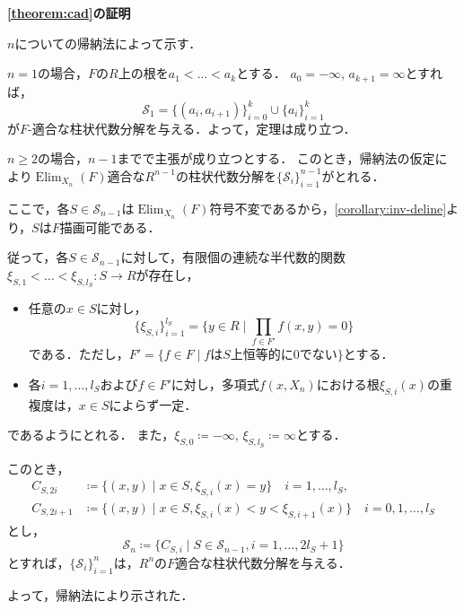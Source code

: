 \documentclass[uplatex, dvipdfmx]{jsarticle}
\makeatletter
\numberwithin{equation}{section}
\renewenvironment{proof}[1][\proofname]{\par
  \pushQED{\qed}%
  \normalfont \topsep6\p@\@plus6\p@\relax
  \trivlist
  \item\relax
  {\bfseries
  #1\@addpunct{.}}\hspace\labelsep\ignorespaces
}{
  \popQED\endtrivlist\@endpefalse
}
\newcommand{\map}[3]{{#1}\colon{#2}\rightarrow{#3}}
\DeclareMathOperator{\Elim}{Elim}
\theoremstyle{definition}
\renewcommand{\proofname}{\textbf{証明}}
\makeatother
\begin{document}
\begin{proof}[\cref{theorem:cad}の証明]
     $n$についての帰納法によって示す．

     $n=1$の場合，$F$の$R$上の根を$a_1 < \dots < a_k$とする．
     $a_0 = -\infty$, $a_{k+1} = \infty$とすれば，
     \begin{equation}
          \mathcal{S}_1 = \{(a_i, a_{i+1})\}_{i=0}^k \cup \{a_i\}_{i=1}^k
     \end{equation}
     が$F$-適合な柱状代数分解を与える．よって，定理は成り立つ．

     $n\geq 2$の場合，$n-1$までで主張が成り立つとする．
     このとき，帰納法の仮定により$\Elim_{X_n}(F)$適合な$R^{n-1}$の柱状代数分解を$\{\mathcal{S}_i\}_{i=1}^{n-1}$がとれる．

     ここで，各$S \in \mathcal{S}_{n-1}$は$\Elim_{X_n}(F)$符号不変であるから，\cref{corollary:inv-deline}より，$S$は$F$描画可能である．

     従って，各$S \in \mathcal{S}_{n-1}$に対して，有限個の連続な半代数的関数$\map{\xi_{S,1}< \dots < \xi_{S,l_S}}{S}{R}$が存在し，
     \begin{itemize}
          \item 任意の$ x \in S $に対し，
          \begin{equation}
               \{\xi_{S,i}\}_{i=1}^{l_S} = \{y \in R \mid \prod_{f \in F'}f(x,y)=0\}
          \end{equation}
          である．ただし，$F' = \{f \in F \mid \text{$f$は$S$上恒等的に0でない}\}$とする．
          \item 各$i=1, \dots, l_S$および$f \in F'$に対し，多項式$f(x,X_n)$における根$\xi_{S,i}(x)$の重複度は，$x\in S$によらず一定．
     \end{itemize}
     であるようにとれる．
     また，$\xi_{S,0} \coloneqq -\infty$, $\xi_{S,l_S} \coloneqq \infty$とする．

     このとき，
     \begin{align}
          C_{S,2i} &\coloneqq \{(x,y) \mid  x \in S, \xi_{S,i}(x) = y \} \quad i = 1,\dots, l_S,\\
          C_{S,2i+1} &\coloneqq \{(x,y) \mid x \in S, \xi_{S,i}(x)<y<\xi_{S,i+1}(x) \} \quad i = 0,1, \dots, l_S 
     \end{align}
     とし，
     \begin{equation}
          \mathcal{S}_n \coloneqq \{C_{S,i} \mid S \in \mathcal{S}_{n-1}, i=1, \dots, 2l_S+1\}
     \end{equation}
     とすれば，$\{\mathcal{S}_i\}_{i=1}^n$は，$R^n$の$F$適合な柱状代数分解を与える．

     よって，帰納法により示された．
\end{proof}
\end{document}

